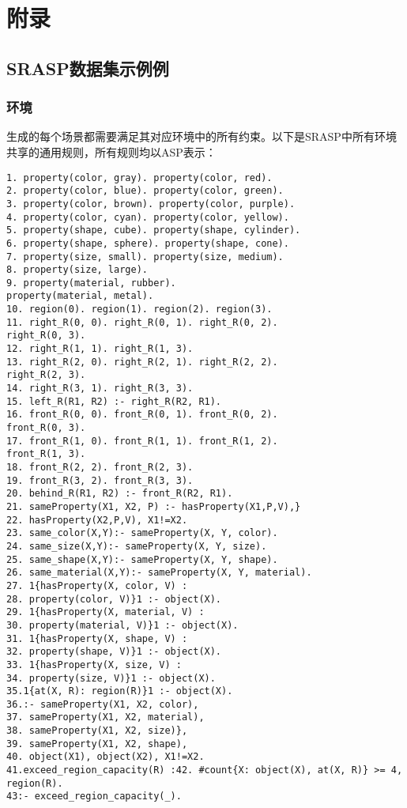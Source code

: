 \chapter{附录}
\section{SRASP数据集示例例}
\subsection{环境}
\label{appendix:environment}
生成的每个场景都需要满足其对应环境中的所有约束。以下是SRASP中所有环境共享的通用规则，所有规则均以ASP表示：
\begin{lstlisting}
1. property(color, gray). property(color, red).
2. property(color, blue). property(color, green).
3. property(color, brown). property(color, purple).
4. property(color, cyan). property(color, yellow).
5. property(shape, cube). property(shape, cylinder).
6. property(shape, sphere). property(shape, cone).
7. property(size, small). property(size, medium).
8. property(size, large).
9. property(material, rubber).
property(material, metal).
10. region(0). region(1). region(2). region(3).
11. right_R(0, 0). right_R(0, 1). right_R(0, 2).
right_R(0, 3).
12. right_R(1, 1). right_R(1, 3).
13. right_R(2, 0). right_R(2, 1). right_R(2, 2).
right_R(2, 3).
14. right_R(3, 1). right_R(3, 3).
15. left_R(R1, R2) :- right_R(R2, R1).
16. front_R(0, 0). front_R(0, 1). front_R(0, 2).
front_R(0, 3).
17. front_R(1, 0). front_R(1, 1). front_R(1, 2).
front_R(1, 3).
18. front_R(2, 2). front_R(2, 3).
19. front_R(3, 2). front_R(3, 3).
20. behind_R(R1, R2) :- front_R(R2, R1).
21. sameProperty(X1, X2, P) :- hasProperty(X1,P,V),}
22. hasProperty(X2,P,V), X1!=X2.
23. same_color(X,Y):- sameProperty(X, Y, color).
24. same_size(X,Y):- sameProperty(X, Y, size).
25. same_shape(X,Y):- sameProperty(X, Y, shape).
26. same_material(X,Y):- sameProperty(X, Y, material).
27. 1{hasProperty(X, color, V) :
28. property(color, V)}1 :- object(X).
29. 1{hasProperty(X, material, V) :
30. property(material, V)}1 :- object(X).
31. 1{hasProperty(X, shape, V) :
32. property(shape, V)}1 :- object(X).
33. 1{hasProperty(X, size, V) :
34. property(size, V)}1 :- object(X).
35.1{at(X, R): region(R)}1 :- object(X).
36.:- sameProperty(X1, X2, color),
37. sameProperty(X1, X2, material),
38. sameProperty(X1, X2, size)},
39. sameProperty(X1, X2, shape),
40. object(X1), object(X2), X1!=X2.
41.exceed_region_capacity(R) :42. #count{X: object(X), at(X, R)} >= 4, region(R).
43:- exceed_region_capacity(_).
\end{lstlisting}

